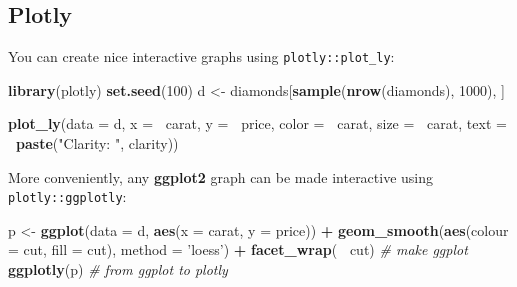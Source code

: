 \documentclass[]{book}
\newenvironment{Shaded}{\begin{snugshade}}{\end{snugshade}}
\newcommand{\KeywordTok}[1]{\textcolor[rgb]{0.13,0.29,0.53}{\textbf{#1}}}
\newcommand{\DataTypeTok}[1]{\textcolor[rgb]{0.13,0.29,0.53}{#1}}
\newcommand{\DecValTok}[1]{\textcolor[rgb]{0.00,0.00,0.81}{#1}}
\newcommand{\StringTok}[1]{\textcolor[rgb]{0.31,0.60,0.02}{#1}}
\newcommand{\CommentTok}[1]{\textcolor[rgb]{0.56,0.35,0.01}{\textit{#1}}}
\newcommand{\OperatorTok}[1]{\textcolor[rgb]{0.81,0.36,0.00}{\textbf{#1}}}
\newcommand{\NormalTok}[1]{#1}
\theoremstyle{definition}
\theoremstyle{definition}
\theoremstyle{definition}
\theoremstyle{remark}
\begin{document}
\subsection{Plotly}\label{plotly}

You can create nice interactive graphs using \texttt{plotly::plot\_ly}:

\begin{Shaded}
\begin{Highlighting}[]
\KeywordTok{library}\NormalTok{(plotly)}
\KeywordTok{set.seed}\NormalTok{(}\DecValTok{100}\NormalTok{)}
\NormalTok{d <-}\StringTok{ }\NormalTok{diamonds[}\KeywordTok{sample}\NormalTok{(}\KeywordTok{nrow}\NormalTok{(diamonds), }\DecValTok{1000}\NormalTok{), ]}
\end{Highlighting}
\end{Shaded}

\begin{Shaded}
\begin{Highlighting}[]
\KeywordTok{plot_ly}\NormalTok{(}\DataTypeTok{data =}\NormalTok{ d, }\DataTypeTok{x =} \OperatorTok{~}\NormalTok{carat, }\DataTypeTok{y =} \OperatorTok{~}\NormalTok{price, }\DataTypeTok{color =} \OperatorTok{~}\NormalTok{carat, }\DataTypeTok{size =} \OperatorTok{~}\NormalTok{carat, }\DataTypeTok{text =} \OperatorTok{~}\KeywordTok{paste}\NormalTok{(}\StringTok{"Clarity: "}\NormalTok{, clarity))}
\end{Highlighting}
\end{Shaded}

More conveniently, any \textbf{ggplot2} graph can be made interactive
using \texttt{plotly::ggplotly}:

\begin{Shaded}
\begin{Highlighting}[]
\NormalTok{p <-}\StringTok{ }\KeywordTok{ggplot}\NormalTok{(}\DataTypeTok{data =}\NormalTok{ d, }\KeywordTok{aes}\NormalTok{(}\DataTypeTok{x =}\NormalTok{ carat, }\DataTypeTok{y =}\NormalTok{ price)) }\OperatorTok{+}
\StringTok{  }\KeywordTok{geom_smooth}\NormalTok{(}\KeywordTok{aes}\NormalTok{(}\DataTypeTok{colour =}\NormalTok{ cut, }\DataTypeTok{fill =}\NormalTok{ cut), }\DataTypeTok{method =} \StringTok{'loess'}\NormalTok{) }\OperatorTok{+}\StringTok{ }
\StringTok{  }\KeywordTok{facet_wrap}\NormalTok{(}\OperatorTok{~}\StringTok{ }\NormalTok{cut) }\CommentTok{# make ggplot}
\KeywordTok{ggplotly}\NormalTok{(p) }\CommentTok{# from ggplot to plotly}
\end{Highlighting}
\end{Shaded}
\end{document}
